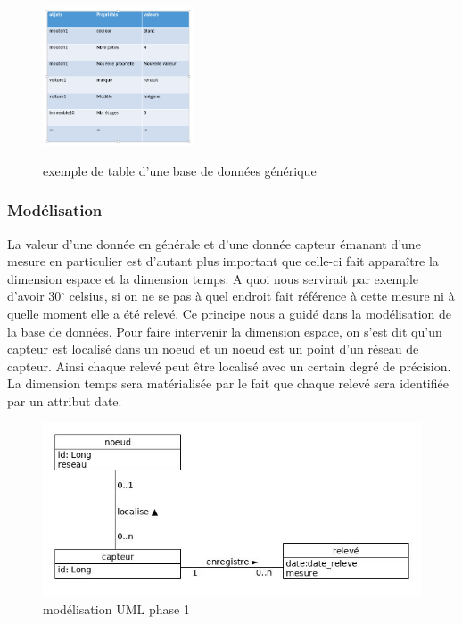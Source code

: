 \begin{figure}[h!]
    \begin{center}
    \label{exemple de table d'une base de données générique}
         \includegraphics[width=0.4\textwidth]{images/bd_image2.png}
    \caption{exemple de table d'une base de données générique}
    \end{center}
\end{figure}


\subsubsection{Modélisation}
La valeur d'une donnée en générale et d'une donnée capteur émanant d'une mesure en particulier est d'autant plus important que celle-ci fait apparaître la dimension espace et la dimension temps.
A quoi nous servirait par exemple d'avoir 30$^\circ$ celsius, si on ne se pas à quel endroit fait référence à cette mesure ni à quelle moment elle a été relevé. Ce principe nous a guidé dans la modélisation de la base de données.
Pour faire intervenir la dimension espace, on s'est dit qu'un capteur est localisé dans un noeud et un noeud est un point d'un réseau de capteur. Ainsi chaque relevé peut être localisé avec un certain degré de précision.
La dimension temps sera matérialisée par le fait que chaque relevé sera identifiée par un attribut date. 
\begin{figure}[!h]
    \begin{center}
         \includegraphics[width=1\textwidth]{images/uml_image1.jpg}
    \caption{modélisation UML phase 1}
    \label{fig:modélisation UML phase 1}
    \end{center}
\end{figure}

